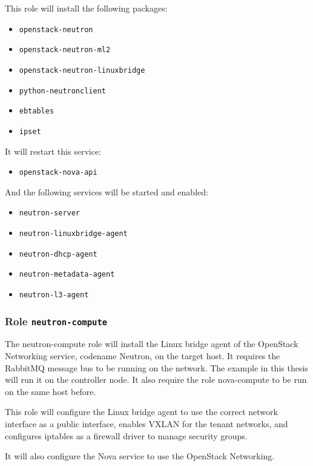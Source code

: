 This role will install the following packages:
\begin{itemize}
  \item{\texttt{openstack-neutron}}
  \item{\texttt{openstack-neutron-ml2}}
  \item{\texttt{openstack-neutron-linuxbridge}}
  \item{\texttt{python-neutronclient}}
  \item{\texttt{ebtables}}
  \item{\texttt{ipset}}
\end{itemize}
It will restart this service:
\begin{itemize}
  \item{\texttt{openstack-nova-api}}
\end{itemize}
And the following services will be started and enabled:
\begin{itemize}
  \item{\texttt{neutron-server}}
  \item{\texttt{neutron-linuxbridge-agent}}
  \item{\texttt{neutron-dhcp-agent}}
  \item{\texttt{neutron-metadata-agent}}
  \item{\texttt{neutron-l3-agent}}
\end{itemize}


\subsubsection*{Role \texttt{neutron-compute}}
The neutron-compute role will install the Linux bridge agent of the OpenStack Networking service, codename Neutron, on the target host.  It requires the RabbitMQ message bus to be running on the network. The example in this thesis will run it on the controller node. It also require the role nova-compute to be run on the same host before.

This role will configure the Linux bridge agent to use the correct network interface as a public interface, enables VXLAN for the tenant networks, and configures iptables as a firewall driver to manage security groups.

It will also configure the Nova service to use the OpenStack Networking.


